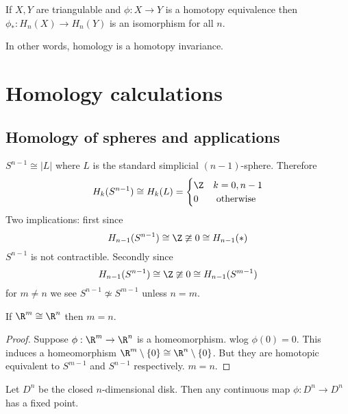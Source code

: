 \documentclass[a4paper]{article}
\begin{document}
\begin{corollary}
  If \(X, Y\) are triangulable and \(\phi: X \to Y\) is a homotopy equivalence then \(\phi_*: H_n(X) \to H_n(Y)\) is an isomorphism for all \(n\).
\end{corollary}

In other words, homology is a homotopy invariance.

\section{Homology calculations}

\subsection{Homology of spheres and applications}

\begin{eg}
  \(S^{n - 1} \cong |L|\) where \(L\) is the standard simplicial \((n - 1)\)-sphere. Therefore
  \[
    H_k(S^{n - 1}) \cong H_k(L) =
    \begin{cases}
      \Z & k = 0, n - 1 \\
      0 & \text{ otherwise}
    \end{cases}
  \]
  Two implications: first since
  \[
    H_{n - 1}(S^{n - 1}) \cong \Z \ncong 0 \cong H_{n - 1}(*)
  \]
  \(S^{n - 1}\) is not contractible. Secondly since
  \[
    H_{n - 1}(S^{n - 1}) \cong \Z \ncong 0 \cong H_{n - 1}(S^{m - 1})
  \]
  for \(m \neq n\) we see \(S^{n - 1} \nsimeq S^{m - 1}\) unless \(n = m\).
\end{eg}

\begin{theorem}
  If \(\R^m \cong \R^n\) then \(m = n\).
\end{theorem}

\begin{proof}
  Suppose \(\phi: \R^m \to \R^n\) is a homeomorphism. wlog \(\phi(0) = 0\). This induces a homeomorphism \(\R^m \setminus \{0\} \cong \R^n \setminus \{0\}\). But they are homotopic equivalent to \(S^{m - 1}\) and \(S^{n - 1}\) respectively. \(m = n\).
\end{proof}

\begin{theorem}
  Let \(D^n\) be the closed \(n\)-dimensional disk. Then any continuous map \(\phi: D^n \to D^n\) has a fixed point.
\end{theorem}
\end{document}
